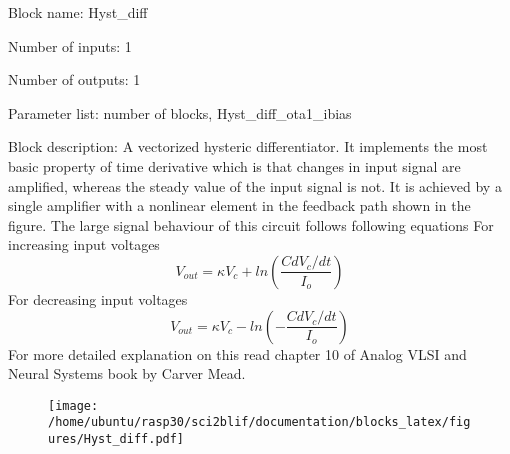 \pagebreak

Block name: Hyst\_diff

Number of inputs: 1

Number of outputs: 1

Parameter list: number of blocks, Hyst\_diff\_ota1\_ibias

Block description: 
A vectorized hysteric differentiator. It implements the most basic property of time derivative which is that changes in input signal are amplified, whereas the steady value of the input signal is not. 
It is achieved by a single amplifier with a nonlinear element in the feedback path shown in the figure. 
The large signal behaviour of this circuit follows following equations
For increasing input voltages
\begin{equation}
V_{out} = \kappa V_c + ln(\frac{C dV_c/dt}{I_o})
\end{equation}
For decreasing input voltages
\begin{equation}
V_{out} = \kappa V_c - ln(-\frac{C dV_c/dt}{I_o})
\end{equation}
For more detailed explanation on this read chapter 10 of Analog VLSI and Neural Systems book by Carver Mead.

\begin{figure}[H]  %
\texttt{[image: /home/ubuntu/rasp30/sci2blif/documentation/blocks\_latex/figures/Hyst\_diff.pdf]}
\end{figure}

